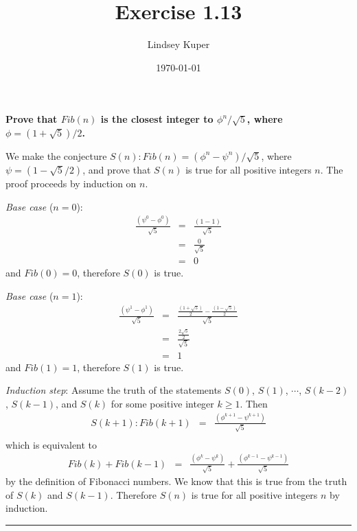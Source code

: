 \documentclass[11pt]{article}
\title{Exercise 1.13}
\author{Lindsey Kuper}
\date{\today}
\newcommand{\statement}[1]{\textbf{#1} \medskip}
\newcommand{\qed}{\hfill \rule{1.3ex}{1.3ex}}
\begin{document}
\maketitle

\statement{Prove that $Fib(n)$ is the closest integer to $\phi^n / \sqrt{5}$, where $\phi = (1 + \sqrt{5}) / 2$.}

We make the conjecture $S(n): Fib(n) = ( \phi^n - \psi^n ) / \sqrt{5}$, where $\psi = (1 - \sqrt{5} / 2)$, and prove that $S(n)$ is true for all positive integers $n$.  The proof proceeds by induction on $n$.

\textit{Base case} ($n = 0$):  
\begin{eqnarray*}
  \frac{\left(\psi^0 - \phi^0\right)}{\sqrt{5}} & = & \frac{\left(1 - 1\right)}{\sqrt{5}} \\
& = & \frac{0}{\sqrt{5}} \\
& = & 0
\end{eqnarray*}
and $Fib(0) = 0$, therefore $S(0)$ is true.

\textit{Base case} ($n = 1$):
\begin{eqnarray*}
  \frac{\left(\psi^1 - \phi^1\right)}{\sqrt{5}} & = & \frac{  
  \frac{\left(1 + \sqrt{5}\right)}{2} -
  \frac{\left(1 - \sqrt{5}\right)}{2}
  }{\sqrt{5}} \\
& = & \frac{
\frac{2\sqrt{5}}{2}
}{\sqrt{5}} \\
& = & 1
\end{eqnarray*}
and $Fib(1) = 1$, therefore $S(1)$ is true.

\textit{Induction step}:  Assume the truth of the statements $S(0)$, $S(1)$, $\cdots$, $S(k-2)$, $S(k-1)$, and $S(k)$ for some positive integer $k \geq 1$.  Then
\begin{eqnarray*}
S(k + 1): Fib(k + 1) & = & \frac{\left(\phi^{k+1} - \psi^{k+1}\right)}{\sqrt{5}} \\
\end{eqnarray*}
which is equivalent to
\begin{eqnarray*}
Fib(k) + Fib(k-1) & = & \frac{\left(\phi^{k} - \psi^{k}\right)}{\sqrt{5}} +  \frac{\left(\phi^{k-1} - \psi^{k-1}\right)}{\sqrt{5}}
\end{eqnarray*}
by the definition of Fibonacci numbers.  We know that this is true from the truth of $S(k)$ and $S(k -1)$.  Therefore $S(n)$ is true for all positive integers $n$ by induction.\qed
\end{document}
